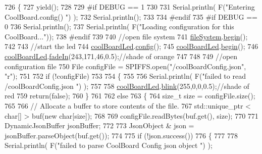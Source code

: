 \begin{DoxyCode}
726 \{
727     yield();
728 
729 \textcolor{preprocessor}{#if DEBUG == 1}
730 
731     Serial.println( F(\textcolor{stringliteral}{"Entering CoolBoard.config() "}) );
732     Serial.println();
733 
734 \textcolor{preprocessor}{#endif}
735 \textcolor{preprocessor}{#if DEBUG == 0}
736     Serial.println();
737     Serial.println( F(\textcolor{stringliteral}{"Loading configuration for this CoolBoard..."}));
738 \textcolor{preprocessor}{#endif }
739 
740     \textcolor{comment}{//open file system}
741     \hyperlink{class_cool_board_a42c2586fbb13ff7f06538e9284e8538d}{fileSystem}.\hyperlink{class_cool_file_system_a6ba6f666ed4c530174f8569d2c636748}{begin}();
742     
743     \textcolor{comment}{//start the led}
744     \hyperlink{class_cool_board_a1b1d3c684a5baa56b08486e192fd8e97}{coolBoardLed}.\hyperlink{class_cool_board_led_a1b60e5e30bea96c49ed62ed1bf1ffc8b}{config}();
745     \hyperlink{class_cool_board_a1b1d3c684a5baa56b08486e192fd8e97}{coolBoardLed}.\hyperlink{class_cool_board_led_ae3cbde8affcc6f011cbd698c8ef911f6}{begin}();
746     \hyperlink{class_cool_board_a1b1d3c684a5baa56b08486e192fd8e97}{coolBoardLed}.\hyperlink{class_cool_board_led_ab778f5e7bed0ab74e3906d82110493c3}{fadeIn}(243,171,46,0.5);\textcolor{comment}{//shade of orange     }
747 
748     
749     \textcolor{comment}{//open configuration file}
750     File configFile = SPIFFS.open(\textcolor{stringliteral}{"/coolBoardConfig.json"}, \textcolor{stringliteral}{"r"});
751     
752     \textcolor{keywordflow}{if} (!configFile)
753 
754     \{
755     
756         Serial.println( F(\textcolor{stringliteral}{"failed to read /coolBoardConfig.json  "}) );
757 
758         \hyperlink{class_cool_board_a1b1d3c684a5baa56b08486e192fd8e97}{coolBoardLed}.\hyperlink{class_cool_board_led_a96e1ea13003eee34c9dbcef340404426}{blink}(255,0,0,0.5);\textcolor{comment}{//shade of red     }
759         \textcolor{keywordflow}{return}(\textcolor{keyword}{false});
760     \}
761 
762     \textcolor{keywordflow}{else}
763     \{
764         \textcolor{keywordtype}{size\_t} size = configFile.size();
765 
766         \textcolor{comment}{// Allocate a buffer to store contents of the file.}
767         std::unique\_ptr < char[] > buf(\textcolor{keyword}{new} \textcolor{keywordtype}{char}[size]);
768 
769         configFile.readBytes(buf.get(), size);
770 
771         DynamicJsonBuffer jsonBuffer;
772 
773         JsonObject & json = jsonBuffer.parseObject(buf.get());
774 
775         \textcolor{keywordflow}{if} (!json.success())
776         \{
777         
778             Serial.println( F(\textcolor{stringliteral}{"failed to parse CoolBoard Config json object "}) );

\end{DoxyCode}
